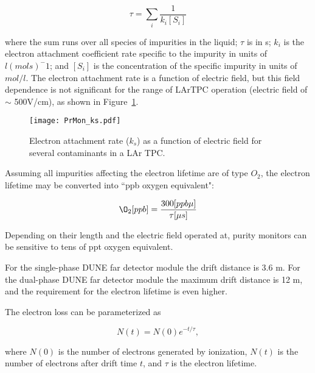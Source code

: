 $$\tau = \sum_i \frac{1}{k_i [S_i]}$$

where the sum runs over all species of impurities in the liquid; $\tau$ is in s; $k_i$ is the electron attachment coefficient rate specific to the impurity in units of $l (mol s)^-1$; and $[S_i]$ is the concentration of the specific impurity in units of $mol/l$. The electron attachment rate is a function of electric field, but this field dependence is not significant for the range of LArTPC operation (electric field of $\sim$ 500V/cm), as shown in Figure~\ref{fig:ks}.

\begin{figure}[h]
\centering
\texttt{[image: PrMon\_ks.pdf]}
\caption{Electron attachment rate ($k_s$) as a function of electric field for several contaminants in a LAr TPC.}\label{fig:ks}
\end{figure}

Assuming all impurities affecting the electron lifetime are of type $O_2$, the electron lifetime may be converted into ``ppb oxygen equivalent":

$$ \O_2 [ppb] = \frac{300 [ppb \mu]}{\tau [\mu s]}$$

Depending on their length and the electric field operated at, purity monitors can be sensitive to tens of ppt oxygen equivalent. 

For the single-phase DUNE far detector module the drift distance is 3.6 m. For the dual-phase DUNE far detector module the maximum drift distance is 12 m, and the requirement for the electron lifetime is even higher. 


The electron loss can be parameterized as

$$N(t) = N(0)e^{-t/\tau},$$

where $N(0)$ is the number of electrons generated by ionization, $N(t)$ is the number of electrons after drift time $t$, and $\tau$ is the electron lifetime. 




